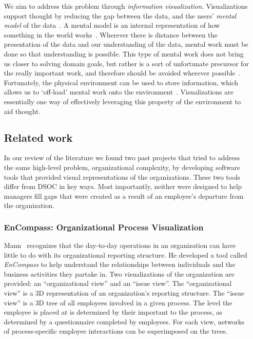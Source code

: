 \documentclass[journal]{vgtc}                %
\begin{document}
We aim to address this problem through \emph{information visualization}. Visualizations support thought by reducing the gap between the data, and the users' \emph{mental model} of the data~\cite{yi2007toward}. A mental model is an internal representation of how something in the world works~\cite{staggersmodel,norman2014some}. Wherever there is distance between the presentation of the data and our understanding of the data, mental work must be done so that understanding is possible. This type of mental work does not bring us closer to solving domain goals, but rather is a sort of unfortunate precursor for the really important work, and therefore should be avoided wherever possible~\cite{paas2003cognitive}. Fortunately, the physical environment can be used to store information, which allows us to \lq off-load\rq{} mental work onto the environment~\cite{wilson2002six}. Visualizations are essentially one way of effectively leveraging this property of the environment to aid thought.

\subsection{Related work}

In our review of the literature we found two past projects that tried to address the same high-level problem, organizational complexity, by developing software tools that provided visual representations of the organizations. These two tools differ from DSOC in key ways. Most importantly, neither were designed to help managers fill gaps that were created as a result of an employee's departure from the organization. 

\subsubsection{EnCompass: Organizational Process Visualization}

Mann~\cite{mann1999organizational} recognizes that the day-to-day operations in an organization can have little to do with its organizational reporting structure. He developed a tool called \emph{EnCompass} to help understand the relationships between individuals and the business activities they partake in. Two visualizations of the organization are provided: an ``organizational view'' and an ``issue view''. The ``organizational view'' is a 3D representation of an organization's reporting structure. The ``issue view'' is a 3D tree of all employees involved in a given process. The level the employee is placed at is determined by their important to the process, as determined by a questionnaire completed by employees. For each view, networks of process-specific employee interactions can be superimposed on the trees.
\end{document}
